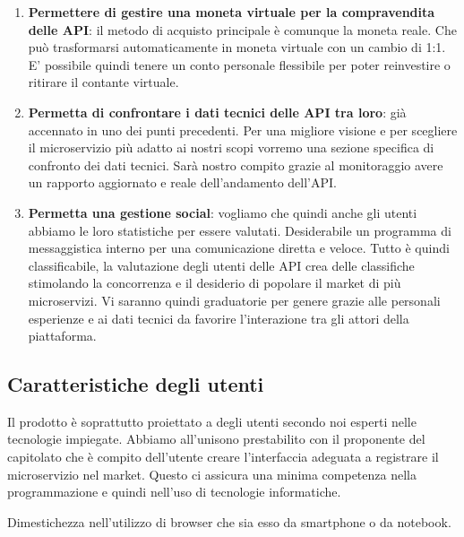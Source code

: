 \documentclass[12pt,a4paper,titlepage]{article}
\begin{document}
\begin{enumerate}
		\item \textbf{Permettere di gestire una moneta virtuale per la compravendita delle API}:	il metodo di acquisto principale è comunque la moneta reale. Che può trasformarsi automaticamente in moneta virtuale con un cambio di 1:1. E' possibile quindi tenere un conto personale flessibile per poter reinvestire o ritirare il contante virtuale. 
		\item \textbf{Permetta di confrontare i dati tecnici delle API tra loro}:	già accennato in uno dei punti precedenti. Per una migliore visione e per scegliere il microservizio più adatto ai nostri scopi vorremo una sezione specifica di confronto dei dati tecnici. Sarà nostro compito grazie al monitoraggio avere un rapporto aggiornato e reale dell'andamento dell'API.
		\item \textbf{Permetta una gestione social}:	vogliamo che quindi anche gli utenti abbiamo le loro statistiche per essere valutati. Desiderabile un programma di messaggistica interno per una comunicazione diretta e veloce. Tutto è quindi classificabile, la valutazione degli utenti delle API crea delle classifiche stimolando la concorrenza e il desiderio di popolare il market di più microservizi. Vi saranno quindi graduatorie per genere grazie alle personali esperienze e ai dati tecnici da favorire l'interazione tra gli attori della piattaforma.
	\end{enumerate}
	\subsection{Caratteristiche degli utenti}
	Il prodotto è soprattutto proiettato a degli utenti secondo noi esperti nelle tecnologie impiegate. Abbiamo all'unisono prestabilito con il proponente del capitolato che è compito dell'utente creare l'interfaccia adeguata a registrare il microservizio nel market. Questo ci assicura una minima competenza nella programmazione e quindi nell'uso di tecnologie informatiche.
	
	Dimestichezza nell'utilizzo di browser che sia esso da smartphone o da notebook. 
\end{document}
